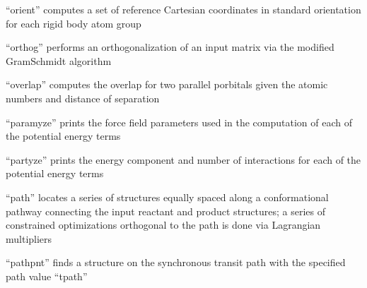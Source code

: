 \documentclass[letterpaper,11pt,english]{sphinxmanual}
\begin{document}
“orient” computes a set of reference Cartesian coordinates
in standard orientation for each rigid body atom group


“orthog” performs an orthogonalization of an input matrix
via the modified Gram\sphinxhyphen{}Schmidt algorithm


“overlap” computes the overlap for two parallel p\sphinxhyphen{}orbitals
given the atomic numbers and distance of separation


“paramyze” prints the force field parameters used in the
computation of each of the potential energy terms


“partyze” prints the energy component and number of
interactions for each of the potential energy terms












“path” locates a series of structures equally spaced along
a conformational pathway connecting the input reactant and
product structures; a series of constrained optimizations
orthogonal to the path is done via Lagrangian multipliers



“pathpnt” finds a structure on the synchronous transit path
with the specified path value “tpath”

\end{document}
